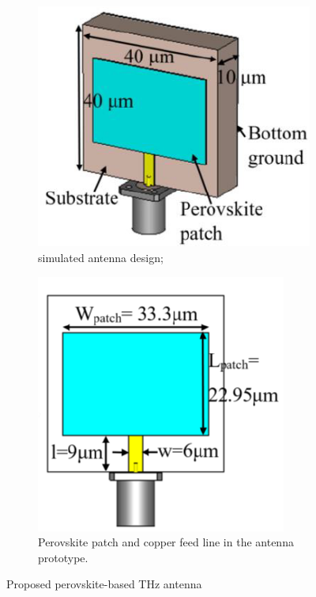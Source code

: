 \documentclass[12pt]{suhbook}
\begin{document}
\begin{figure}[hbt!]
\begin{subfigure}{.5\textwidth}
\centering
\includegraphics[width=.9\linewidth]{15}
\caption{simulated antenna design;}
\label{fig:sfig11a}
\end{subfigure}%
\begin{subfigure}{.4\textwidth}
  \centering
  \includegraphics[width=.9\linewidth]{16}
  \caption{Perovskite patch and copper feed line in the antenna prototype.}
  \label{fig:sfigb11}
\end{subfigure}
\caption{Proposed perovskite-based THz antenna}
\label{fig:fig 11b}
\end{figure}
\end{document}
